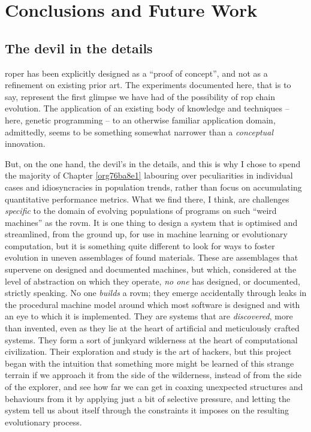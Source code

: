 \documentclass[12pt,glossary]{dalthesis}
\begin{document}
\chapter{Conclusions and Future Work}
\label{sec:org5a009e0}
\label{orga023b02}

\section{The devil in the details}
\label{sec:org92d0c89}

\Gls{roper} has been explicitly designed as a ``proof of concept'', and not
as a refinement on existing prior art. The experiments documented here,
that is to say, represent the first glimpse we have had of the possibility
of \gls{rop} chain evolution. The application of an existing body of knowledge
and techniques -- here, genetic programming -- to an otherwise familiar
application domain, admittedly, seems to be something somewhat narrower than
a \emph{conceptual} innovation. 

But, on the one hand, the devil's in the details, and this is why I chose to
spend the majority of Chapter \ref{org76ba8e1} labouring over peculiarities
in individual cases and idiosyncracies in population trends, rather than focus
on accumulating quantitative performance metrics. What we find there, I think,
are challenges \emph{specific} to the domain of evolving populations of programs on
such ``weird machines'' as the \gls{rovm}. It is one thing to design a system that
is optimised and streamlined, from the ground up, for use in machine learning
or evolutionary computation, but it is something quite different to look for
ways to foster evolution in uneven assemblages of found materials. These are
assemblages that supervene on designed and documented machines, but which,
considered at the level of abstraction on which they operate, \emph{no one} has
designed, or documented, strictly speaking. No one \emph{builds} a \gls{rovm}; they
emerge accidentally through leaks in the procedural machine model around which
most software is designed and with an eye to which it is implemented. They
are systems that are \emph{discovered}, more than invented, even as they lie at
the heart of artificial and meticulously crafted systems. They form a sort
of junkyard wilderness at the heart of computational civilization. Their
exploration and study is the art of hackers, but this project began with the
intuition that something more might be learned of this strange terrain if
we approach it from the side of the wilderness, instead of from the side of
the explorer, and see how far we can get in coaxing unexpected structures 
and behaviours from it by applying just a bit of selective pressure, and
letting the system tell us about itself through the constraints it imposes 
on the resulting evolutionary process. 
\end{document}
